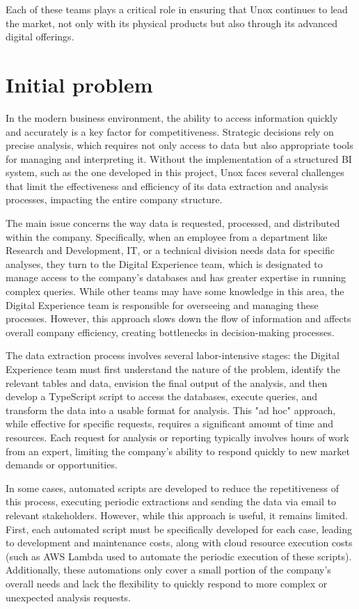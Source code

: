 Each of these teams plays a critical role in ensuring that Unox continues to lead the market, not only with its physical products but also through its advanced digital offerings.

\section{Initial problem}

In the modern business environment, the ability to access information quickly and accurately is a key factor for competitiveness. Strategic decisions rely on precise analysis, which requires not only access to data but also appropriate tools for managing and interpreting it. Without the implementation of a structured \ac{BI} system, such as the one developed in this project, Unox faces several challenges that limit the effectiveness and efficiency of its data extraction and analysis processes, impacting the entire company structure.

The main issue concerns the way data is requested, processed, and distributed within the company. Specifically, when an employee from a department like Research and Development, IT, or a technical division needs data for specific analyses, they turn to the Digital Experience team, which is designated to manage access to the company's databases and has greater expertise in running complex queries. While other teams may have some knowledge in this area, the Digital Experience team is responsible for overseeing and managing these processes. However, this approach slows down the flow of information and affects overall company efficiency, creating bottlenecks in decision-making processes.

The data extraction process involves several labor-intensive stages: the Digital Experience team must first understand the nature of the problem, identify the relevant tables and data, envision the final output of the analysis, and then develop a TypeScript script to access the databases, execute queries, and transform the data into a usable format for analysis. This "ad hoc" approach, while effective for specific requests, requires a significant amount of time and resources. Each request for analysis or reporting typically involves hours of work from an expert, limiting the company's ability to respond quickly to new market demands or opportunities.

In some cases, automated scripts are developed to reduce the repetitiveness of this process, executing periodic extractions and sending the data via email to relevant stakeholders. However, while this approach is useful, it remains limited. First, each automated script must be specifically developed for each case, leading to development and maintenance costs, along with cloud resource execution costs (such as \ac{AWS} Lambda used to automate the periodic execution of these scripts). Additionally, these automations only cover a small portion of the company's overall needs and lack the flexibility to quickly respond to more complex or unexpected analysis requests.

